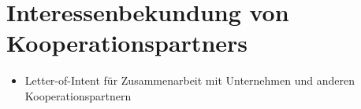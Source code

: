 \section{Interessenbekundung von Kooperationspartners}
\label{app:Interessenbekundung}
\begin{itemize}
  \item Letter-of-Intent für Zusammenarbeit mit Unternehmen und anderen Kooperationspartnern
\end{itemize}